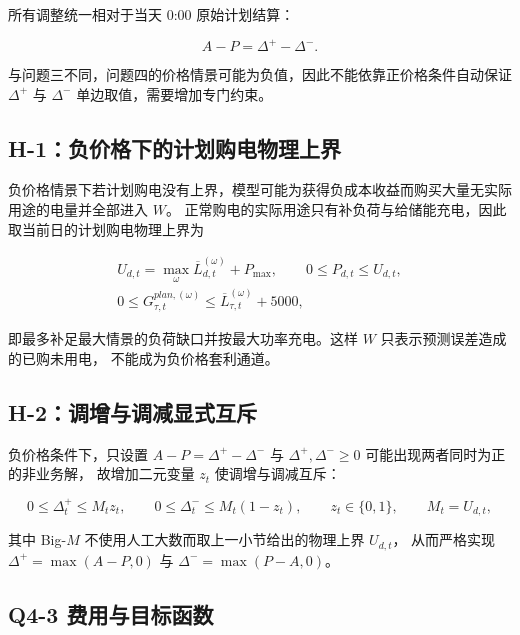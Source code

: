 所有调整统一相对于当天 0:00 原始计划结算：

\begin{equation}
A-P
=
\Delta^+-\Delta^-.
\end{equation}

与问题三不同，问题四的价格情景可能为负值，因此不能依靠正价格条件自动保证 \(\Delta^+\) 与 \(\Delta^-\) 单边取值，需要增加专门约束。

\subsection{H-1：负价格下的计划购电物理上界}

负价格情景下若计划购电没有上界，模型可能为获得负成本收益而购买大量无实际用途的电量并全部进入 \(W\)。
正常购电的实际用途只有补负荷与给储能充电，因此取当前日的计划购电物理上界为

\begin{equation}
\begin{gathered}
U_{d,t}=\max_{\omega}\overline L_{d,t}^{(\omega)}+P_{\max},
\qquad
0\le P_{d,t}\le U_{d,t},\\
0\le G_{\tau,t}^{plan,(\omega)}\le\overline L_{\tau,t}^{(\omega)}+5000,
\end{gathered}
\end{equation}

即最多补足最大情景的负荷缺口并按最大功率充电。这样 \(W\) 只表示预测误差造成的已购未用电，
不能成为负价格套利通道。

\subsection{H-2：调增与调减显式互斥}

负价格条件下，只设置 \(A-P=\Delta^+-\Delta^-\) 与 \(\Delta^+,\Delta^-\ge0\) 可能出现两者同时为正的非业务解，
故增加二元变量 \(z_t\) 使调增与调减互斥：

\begin{equation}
0\le\Delta_t^+\le M_tz_t,
\qquad
0\le\Delta_t^-\le M_t(1-z_t),
\qquad
z_t\in\{0,1\},
\qquad
M_t=U_{d,t},
\end{equation}

其中 Big-\(M\) 不使用人工大数而取上一小节给出的物理上界 \(U_{d,t}\)，
从而严格实现 \(\Delta^+=\max(A-P,0)\) 与 \(\Delta^-=\max(P-A,0)\)。

\subsection{Q4-3 费用与目标函数}


